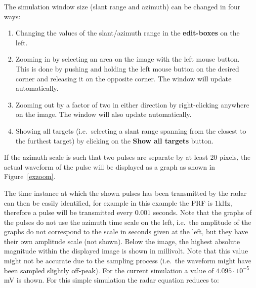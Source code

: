 The simulation window size (slant range and azimuth) can be changed in four
ways:

\begin{enumerate}
\item  Changing the values of the slant/azimuth range in the \textbf{%
edit-boxes} on the left.

\item  Zooming in by selecting an area on the image with the left mouse
button. This is done by pushing and holding the left mouse button on the
desired corner and releasing it on the opposite corner. The window will
update automatically.

\item  Zooming out by a factor of two in either direction by right-clicking
anywhere on the image. The window will also update automatically.

\item  Showing all targets (i.e.~selecting a slant range spanning from the
closest to the furthest target) by clicking on the \textbf{Show all targets}
button.
\end{enumerate}

If the azimuth scale is such that two pulses are separate by at least $20$
pixels, the actual waveform of the pulse will be displayed as a graph as
shown in Figure~\ref{exzoom}.


The time instance at which the shown pulses has been transmitted by the
radar can then be easily identified, for example in this example the PRF is $%
1$\thinspace kHz, therefore a pulse will be transmitted every $0.001$
seconds. Note that the graphs of the pulses do not use the azimuth time
scale on the left, i.e.~the amplitude of the graphs do not correspond to the
scale in seconds given at the left, but they have their own amplitude scale
(not shown). Below the image, the highest absolute magnitude within the
displayed image is shown in millivolt. Note that this value might not be
accurate due to the sampling process (i.e.~the waveform might have been
sampled slightly off-peak). For the current simulation a value of $%
4.095\cdot 10^{-5}$\thinspace mV is shown. For this simple simulation the
radar equation reduces to:

